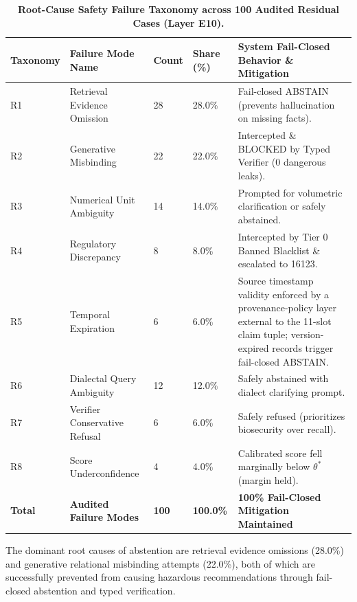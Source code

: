 \documentclass[11pt,a4paper]{article}
\begin{document}
\begin{table}[t]
\centering
\small
\caption{\textbf{Root-Cause Safety Failure Taxonomy across 100 Audited Residual Cases (Layer E10).}}
\label{tab:failure_taxonomy}
\begin{tabularx}{\textwidth}{@{} L{1.8cm} L{3.6cm} R{1.2cm} R{1.4cm} Y @{}}
\toprule
\textbf{Taxonomy} & \textbf{Failure Mode Name} & \textbf{Count} & \textbf{Share (\%)} & \textbf{System Fail-Closed Behavior \& Mitigation} \\
\midrule
R1 & Retrieval Evidence Omission & 28 & 28.0\% & Fail-closed ABSTAIN (prevents hallucination on missing facts). \\
R2 & Generative Misbinding & 22 & 22.0\% & Intercepted \& BLOCKED by Typed Verifier (0 dangerous leaks). \\
R3 & Numerical Unit Ambiguity & 14 & 14.0\% & Prompted for volumetric clarification or safely abstained. \\
R4 & Regulatory Discrepancy & 8 & 8.0\% & Intercepted by Tier 0 Banned Blacklist \& escalated to 16123. \\
R5 & Temporal Expiration & 6 & 6.0\% & Source timestamp validity enforced by a provenance-policy layer external to the 11-slot claim tuple; version-expired records trigger fail-closed ABSTAIN. \\
R6 & Dialectal Query Ambiguity & 12 & 12.0\% & Safely abstained with dialect clarifying prompt. \\
R7 & Verifier Conservative Refusal & 6 & 6.0\% & Safely refused (prioritizes biosecurity over recall). \\
R8 & Score Underconfidence & 4 & 4.0\% & Calibrated score fell marginally below $\theta^*$ (margin held). \\
\midrule
\textbf{Total} & \textbf{Audited Failure Modes} & \textbf{100} & \textbf{100.0\%} & \textbf{100\% Fail-Closed Mitigation Maintained} \\
\bottomrule
\end{tabularx}
\vspace{-0.5em}
\end{table}

The dominant root causes of abstention are retrieval evidence omissions (28.0\%) and generative relational misbinding attempts (22.0\%), both of which are successfully prevented from causing hazardous recommendations through fail-closed abstention and typed verification.


\end{document}
